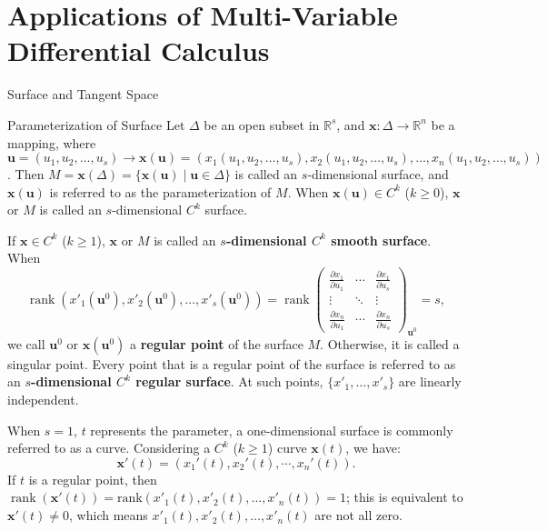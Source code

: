 \documentclass[11pt]{../../TexTemplate/elegantbook}
\begin{document}
\section{Applications of Multi-Variable Differential Calculus}
\begin{leftbarTitle}{Surface and Tangent Space}\end{leftbarTitle}
\begin{definition}{Parameterization of Surface}\label{def:Parameterization of Surface}
    Let \( \Delta \) be an open subset in \( \mathbb{R}^s \), 
    and \( \mathbf{x}: \Delta \to \mathbb{R}^n \) be a mapping, 
    where \( \mathbf{u} = (u_1, u_2, \dots, u_s) \to \mathbf{x}(\mathbf{u}) = 
    (x_1(u_1, u_2, \dots, u_s), x_2(u_1, u_2, \dots, u_s), \dots, x_n(u_1, u_2, \dots, u_s)) \). 
    Then \( M = \mathbf{x}(\Delta) = \{ \mathbf{x}(\mathbf{u}) \mid \mathbf{u} \in \Delta \} \) 
    is called an \( s \)-dimensional surface, and \( \mathbf{x}(\mathbf{u}) \) 
    is referred to as the parameterization of \( M \). 
    When \( \mathbf{x}(\mathbf{u}) \in C^k \) (\( k \geq 0 \)), 
    \( \mathbf{x} \) or \( M \) is called an \( s \)-dimensional \( C^k \) surface. 
    
    If \( \mathbf{x} \in C^k \) (\( k \geq 1 \)), \( \mathbf{x} \) or \( M \) 
    is called an \textbf{\( s \)-dimensional \( C^k \) smooth surface}. When
    \[
    \operatorname{rank}(x'_1(\mathbf{u}^0), x'_2(\mathbf{u}^0), \dots, x'_s(\mathbf{u}^0)) = 
    \operatorname{rank}
    \begin{pmatrix}
    \frac{\partial x_1}{\partial u_1} & \cdots & \frac{\partial x_1}{\partial u_s} \\
    \vdots & \ddots & \vdots \\
    \frac{\partial x_n}{\partial u_1} & \cdots & \frac{\partial x_n}{\partial u_s}
    \end{pmatrix}_{\mathbf{u}^0}
    = s,
    \]
    we call \( \mathbf{u}^0 \) or \( \mathbf{x}(\mathbf{u}^0) \) a \textbf{regular point} of the surface \( M \). 
    Otherwise, it is called a singular point. 
    Every point that is a regular point of the surface is referred to as an \textbf{\( s \)-dimensional \( C^k \) regular surface}. 
    At such points, \( \{x'_1, \dots, x'_s\} \) are linearly independent.
\end{definition}

When \( s = 1 \), \( t \) represents the parameter, a one-dimensional surface is commonly referred to as a curve. 
Considering a \( C^k \) (\( k \geq 1 \)) curve \( \mathbf{x}(t) \), we have:
\[
\mathbf{x}'(t) = \left( x_{1}'(t), x_{2}'(t), \cdots, x_{n}'(t) \right) .
\]
If \( t \) is a regular point, then 
\( \operatorname{rank}(\mathbf{x}'(t)) = \text{rank}(x'_1(t), x'_2(t), \dots, x'_n(t)) = 1 \); 
this is equivalent to \( \mathbf{x}'(t) \neq 0 \), which means \( x'_1(t), x'_2(t), \dots, x'_n(t) \) are not all zero.
\end{document}
